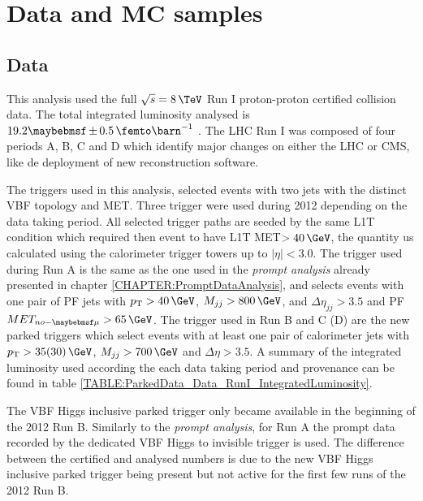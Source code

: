 \section{Data and MC samples}


\subsection{Data}


This analysis used the full  $\sqrt{s}=8\,\TeV$ Run I proton-proton certified collision data. The total integrated luminosity analysed is $19.2 \pm 0.5 \,\femto\barn^{-1}$ \cite{ARTICLE:CMSLuminosityBasedonPixelClusterCounting}. The \gls{LHC} Run I was composed of four periods A, B, C and D which identify major changes on either the \gls{LHC} or \gls{CMS}, like de deployment of new reconstruction software.

The triggers used in this analysis, selected events with two jets with the distinct \gls{VBF} topology and \gls{MET}. Three trigger were used during 2012 depending on the data taking period. All selected trigger paths are seeded by the same \gls{L1T} condition which required then event to have \gls{L1T} \gls{MET}$>40\,\GeV$, the quantity us calculated using the calorimeter trigger towers up to $|\eta|<3.0$. The trigger used during Run A is the same as the one used in the \textit{prompt analysis} already presented in chapter \ref{CHAPTER:PromptDataAnalysis}, and selects events with one pair of \gls{PF} jets with $\pt>40\,\GeV$, $M_{jj}>800\,\GeV$, and $\Delta\eta_{jj}>3.5$ and \gls{PF} $MET_{no-\mu}>65\,\GeV$. The trigger used in Run B and C (D) are the new parked triggers which select events with at least one pair of calorimeter jets with $\pt>35(30)\,\GeV$, $M_{jj}>700\,\GeV$ and $\Delta\eta>3.5$. A summary of the integrated luminosity used according the each data taking period and provenance can be found in table \ref{TABLE:ParkedData_Data_RunI_IntegratedLuminosity}.



The \gls{VBF} Higgs inclusive parked trigger only became available in the beginning of the 2012 Run B. Similarly to the \textit{prompt analysis}, for Run A the prompt data recorded by the dedicated \gls{VBF} Higgs to invisible trigger is used. The difference between the certified and analysed numbers is due to the new \gls{VBF} Higgs inclusive parked trigger being present but not active for the first few runs of the 2012 Run B. 

